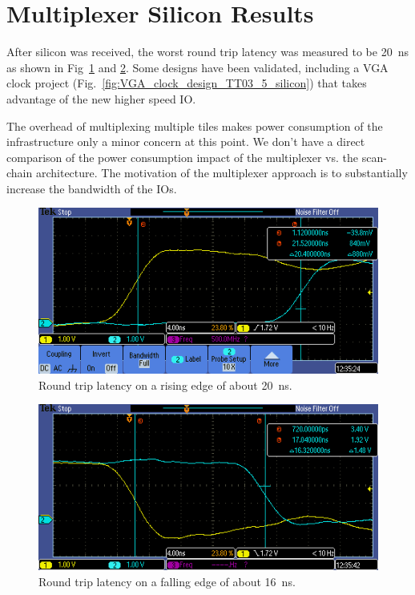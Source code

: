 \section{Multiplexer Silicon Results}
\label{sec:multiplexer_silicon_res}
After silicon was received, the worst round trip latency was measured to be \qty{20}{\ns} as shown in Fig~\ref{fig:round_trip_latency_rising_edge} and \ref{fig:round_trip_latency_falling_edge}. Some designs have been validated, including a VGA clock project (Fig.~\ref{fig:VGA_clock_design_TT03_5_silicon}) that takes advantage of the new higher speed IO.

The overhead of multiplexing multiple tiles makes power consumption of the infrastructure only a minor concern at this point. We don't have a direct comparison of the power consumption impact of the multiplexer vs. the scan-chain architecture. The motivation of the multiplexer approach is to substantially increase the bandwidth of the IOs.

\begin{figure}[!t]
\centering
\includegraphics[width=\columnwidth]{./Figs/tt3p5 rising latency.PNG}
\caption{Round trip latency on a rising edge of about \qty{20}{\ns}.}
\label{fig:round_trip_latency_rising_edge}
\end{figure}

\begin{figure}[!t]
\centering
\includegraphics[width=\columnwidth]{./Figs/tt3p5 falling latency.PNG}
\caption{Round trip latency on a falling edge of about \qty{16}{\ns}.}
\label{fig:round_trip_latency_falling_edge}
\end{figure}

